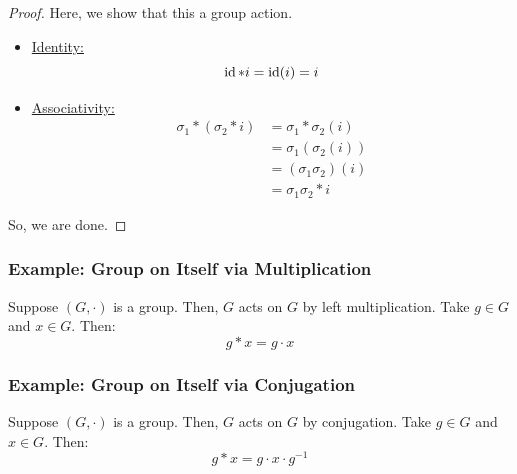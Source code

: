\documentclass[letterpaper]{article}
\begin{document}
\begin{mdframed}
    \begin{proof}
        Here, we show that this a group action. 
        \begin{itemize}
            \item \underline{Identity:}
            \[\operatorname{id} * i = \operatorname{id}(i) = i\]

            \item \underline{Associativity:}
            \begin{equation*}
                \begin{aligned}
                    \sigma_1 * (\sigma_2 * i) &= \sigma_1 * \sigma_{2}(i) \\ 
                        &= \sigma_{1}(\sigma_{2}(i)) \\ 
                        &= (\sigma_{1}\sigma_{2})(i) \\ 
                        &= \sigma_{1}\sigma_{2} * i
                 \end{aligned}
            \end{equation*}
        \end{itemize}
        So, we are done. 
    \end{proof}
\end{mdframed}

\subsubsection{Example: Group on Itself via Multiplication}
Suppose $(G, \cdot)$ is a group. Then, $G$ acts on $G$ by left multiplication. Take $g \in G$ and $x \in G$. Then:  
\[g * x = g \cdot x\]

\subsubsection{Example: Group on Itself via Conjugation}
Suppose $(G, \cdot)$ is a group. Then, $G$ acts on $G$ by conjugation. Take $g \in G$ and $x \in G$. Then:  
\[g * x = g \cdot x \cdot g^{-1}\]
\end{document}
